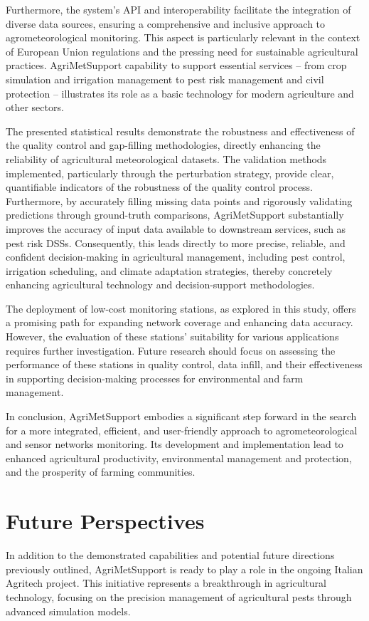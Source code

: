 \documentclass[authoryear,preprint,review,12pt]{elsarticle}
\newcommand{\statusblock}[3]{
    \ifthenelse{\equal{#2}{todo}}
        {\textcolor{red}{#1 (TO DO): #3}}
        {}
    \ifthenelse{\equal{#2}{wip}}
        {\textcolor{magenta}{#1 (IN PROGRESS): #3}}
        {}
    \ifthenelse{\equal{#2}{update}}
        {\textcolor{blue}{#1 (UPDATE): #3}}
        {}
    \ifthenelse{\equal{#2}{review}}
        {\textcolor{cyan}{#1 (REVIEW): #3}}
        {}
    \ifthenelse{\equal{#2}{done}}
        {\textcolor{PineGreen}{#1 (READY): #3}}
        {}
}
\begin{document}
Furthermore, the system's API and interoperability facilitate the integration of diverse data sources, ensuring a comprehensive and inclusive approach to agrometeorological monitoring. This aspect is particularly relevant in the context of European Union regulations and the pressing need for sustainable agricultural practices.
AgriMetSupport capability to support essential services -- from crop simulation and irrigation management to pest risk management and civil protection -- illustrates its role as a basic technology for modern agriculture and other sectors.

The presented statistical results demonstrate the robustness and effectiveness of the quality control and gap-filling methodologies, directly enhancing the reliability of agricultural meteorological datasets. 
The validation methods implemented, particularly through the perturbation strategy, provide clear, quantifiable indicators of the robustness of the quality control process.
Furthermore, by accurately filling missing data points and rigorously validating predictions through ground-truth comparisons, AgriMetSupport substantially improves the accuracy of input data available to downstream services, such as pest risk DSSs. 
Consequently, this leads directly to more precise, reliable, and confident decision-making in agricultural management, including pest control, irrigation scheduling, and climate adaptation strategies, thereby concretely enhancing agricultural technology and decision-support methodologies.

The deployment of low-cost monitoring stations, as explored in this study, offers a promising path for expanding network coverage and enhancing data accuracy.
However, the evaluation of these stations' suitability for various applications requires further investigation.
Future research should focus on assessing the performance of these stations in quality control, data infill, and their effectiveness in supporting decision-making processes for environmental and farm management.

In conclusion, AgriMetSupport embodies a significant step forward in the search for a more integrated, efficient, and user-friendly approach to agrometeorological and sensor networks monitoring.
Its development and implementation lead to enhanced agricultural productivity, environmental management and protection, and the prosperity of farming communities. %

\section*{Future Perspectives}
In addition to the demonstrated capabilities and potential future directions previously outlined, AgriMetSupport is ready to play a role in the ongoing Italian Agritech project. 
This initiative represents a breakthrough in agricultural technology, focusing on the precision management of agricultural pests through advanced simulation models.
\end{document}
